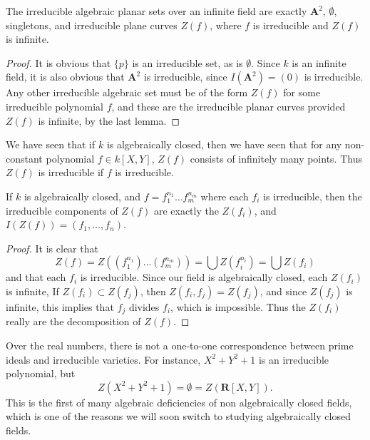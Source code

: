 \begin{corollary}
    The irreducible algebraic planar sets over an infinite field are exactly $\mathbf{A}^2$, $\emptyset$, singletons, and irreducible plane curves $Z(f)$, where $f$ is irreducible and $Z(f)$ is infinite.
\end{corollary}
\begin{proof}
    It is obvious that $\{ p \}$ is an irreducible set, as is $\emptyset$. Since $k$ is an infinite field, it is also obvious that $\mathbf{A}^2$ is irreducible, since $I(\mathbf{A}^2) = (0)$ is irreducible. Any other irreducible algebraic set must be of the form $Z(f)$ for some irreducible polynomial $f$, and these are the irreducible planar curves provided $Z(f)$ is infinite, by the last lemma.
\end{proof}

We have seen that if $k$ is algebraically closed, then we have seen that for any non-constant polynomial $f \in k[X,Y]$, $Z(f)$ consists of infinitely many points. Thus $Z(f)$ is irreducible if $f$ is irreducible.

\begin{corollary}
    If $k$ is algebraically closed, and $f = f_1^{n_1} \dots f_m^{n_m}$ where each $f_i$ is irreducible, then the irreducible components of $Z(f)$ are exactly the $Z(f_i)$, and $I(Z(f)) = (f_1, \dots, f_n)$.
\end{corollary}
\begin{proof}
    It is clear that
    \[ Z(f) = Z((f_1^{n_1}) \dots (f_m^{n_m})) = \bigcup Z(f_i^{n_i}) = \bigcup Z(f_i) \]
    and that each $f_i$ is irreducible. Since our field is algebraically closed, each $Z(f_i)$ is infinite, If $Z(f_i) \subset Z(f_j)$, then $Z(f_i,f_j) = Z(f_j)$, and since $Z(f_j)$ is infinite, this implies that $f_j$ divides $f_i$, which is impossible. Thus the $Z(f_i)$ really are the decomposition of $Z(f)$.
\end{proof}

\begin{example}
    Over the real numbers, there is not a one-to-one correspondence between prime ideals and irreducible varieties. For instance, $X^2 + Y^2 + 1$ is an irreducible polynomial, but
    \[ Z(X^2 + Y^2 + 1) = \emptyset = Z(\mathbf{R}[X,Y]). \]
    This is the first of many algebraic deficiencies of non algebraically closed fields, which is one of the reasons we will soon switch to studying algebraically closed fields.
\end{example}

